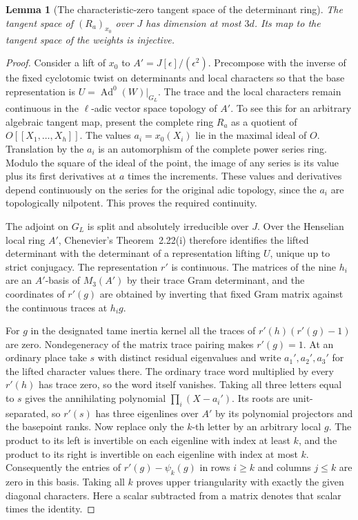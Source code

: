 \documentclass[a4paper,11pt]{article}
\newtheorem{lemma}[proposition]{Lemma}
\theoremstyle{definition}
\theoremstyle{remark}
\numberwithin{equation}{section}
\begin{document}
\begin{lemma}[The characteristic-zero tangent space of the determinant ring]
\label{lem:detangent372}
The tangent space of \((R_a)_{x_0}\) over \(J\) has dimension
at most \(3d\). Its map to the tangent space of the weights
is injective.
\end{lemma}
\begin{proof}
Consider a lift of \(x_0\) to \(A'=J[\epsilon]/(\epsilon^2)\).
Precompose with the inverse of the fixed cyclotomic twist
on determinants and local characters so that the base
representation is \(U=\operatorname{Ad}^0(W)|_{G_L}\).
The trace and the local characters remain continuous in
the \(\ell\)-adic vector space topology of \(A'\).
To see this for an arbitrary algebraic tangent map, present
the complete ring \(R_a\) as a quotient of
\(O[[X_1,\ldots,X_h]]\). The values \(a_i=x_0(X_i)\) lie
in the maximal ideal of \(O\). Translation by the \(a_i\)
is an automorphism of the complete power series ring.
Modulo the square of the ideal of the point, the image of
any series is its value plus its first derivatives at \(a\)
times the increments. These values and derivatives depend
continuously on the series for the original adic topology,
since the \(a_i\) are topologically nilpotent. This proves
the required continuity.

The adjoint on \(G_L\) is split and absolutely irreducible
over \(J\). Over the Henselian local ring \(A'\), Chenevier's
Theorem~2.22(i) therefore identifies the lifted determinant
with the determinant of a representation lifting \(U\),
unique up to strict conjugacy. The representation \(r'\)
is continuous. The matrices of the nine \(h_i\) are an
\(A'\)-basis of \(M_3(A')\) by their trace Gram determinant,
and the coordinates of \(r'(g)\) are obtained by inverting
that fixed Gram matrix against the continuous traces at
\(h_i g\).~\cite{VII-V-chenevier364}

For \(g\) in the designated tame inertia kernel all the
traces of \(r'(h)(r'(g)-1)\) are zero. Nondegeneracy of
the matrix trace pairing makes \(r'(g)=1\). At an ordinary
place take \(s\) with distinct residual eigenvalues and
write \(a_1',a_2',a_3'\) for the lifted character values
there. The ordinary trace word multiplied by every \(r'(h)\)
has trace zero, so the word itself vanishes. Taking all
three letters equal to \(s\) gives the annihilating
polynomial \(\prod_i(X-a_i')\). Its roots are unit-separated,
so \(r'(s)\) has three eigenlines over \(A'\) by its
polynomial projectors and the basepoint ranks. Now replace
only the \(k\)-th letter by an arbitrary local \(g\).
The product to its left is invertible on each eigenline
with index at least \(k\), and the product to its right
is invertible on each eigenline with index at most \(k\).
Consequently the entries of \(r'(g)-\psi_k(g)\) in rows
\(i\ge k\) and columns \(j\le k\) are zero in this basis.
Taking all \(k\) proves upper triangularity with exactly the
given diagonal characters. Here a scalar subtracted from a
matrix denotes that scalar times the identity.


\end{proof}
\end{document}
